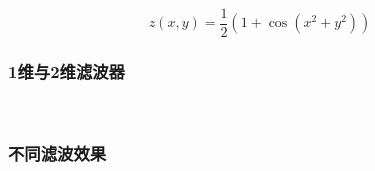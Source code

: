 \documentclass{beamer}
\begin{document}
{{\begin{frame}
  \[ z (x, y) = \frac{1}{2} (1 + \cos (x^2 + y^2)) \]
\end{frame}}{\begin{frame}
  \frametitle{1维与2维滤波器}
  
  \
  
\end{frame}}{\begin{frame}
  \frametitle{不同滤波效果}
  
  \
  

\end{frame}}}
\end{document}
